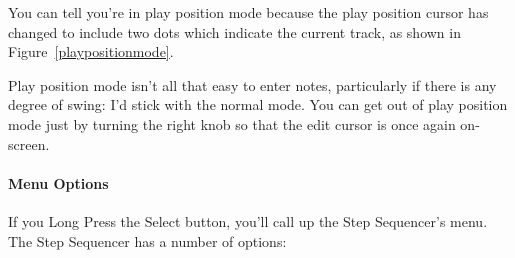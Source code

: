 \documentclass{article}
\begin{document}
You can tell you're in play position mode because the play position cursor has changed to include two dots which indicate the current track, as shown in Figure~\ref{playpositionmode}.

Play position mode isn't all that easy to enter notes, particularly if there is any degree of swing: I'd stick with the normal mode.  You can get out of play position mode just by turning the right knob so that the edit cursor is once again on-screen.

\paragraph{Menu Options}

If you Long Press the Select button, you'll call up the Step Sequencer's menu.  The Step Sequencer has a number of options:
\end{document}
